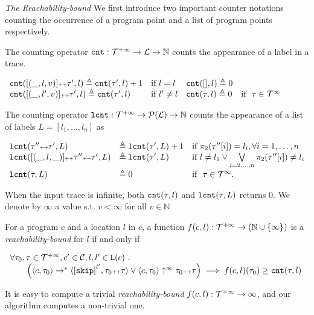 \emph{The Reachability-bound}
We first introduce two important counter notations counting the occurrence of a program point and a list of program points respectively.
\begin{defn}
 \label{def:counter}
The counting operator $\mathtt{cnt} : \mathcal{T}^{+\infty} \to \mathcal{L} \to \mathbb{N}$
counts the appearance of a label in a trace.
\begin{center}
{\small
$
\begin{array}{llll}
\mathtt{cnt}([(\_, l, v)] {\scriptscriptstyle ++} \mathtt{\tau}', l ) \triangleq \mathtt{cnt}(\mathtt{\tau}', l) + 1 & \text{if}~ l = l
&
\mathtt{cnt}({[]}, l) \triangleq 0 & 
\\
\mathtt{cnt}([(\_, l', v)] {\scriptscriptstyle ++} \mathtt{\tau}', l) \triangleq \mathtt{cnt}(\mathtt{\tau}', l) & \text{if}~ l' \neq l
&
\mathtt{cnt}(\mathtt{\tau}, l) \triangleq 0 & \text{if }~ \mathtt{\tau} \in \mathcal{T}^{\infty}
\end{array}
$
}
\end{center}
\end{defn}
\begin{defn}
 \label{def:lcounter}
 The counting operator $\mathtt{lcnt} : \mathcal{T}^{+\infty} \to \mathcal{P}(\mathcal{L}) \to \mathbb{N}$
 counts the appearance of a list of labels $L = [l_1, \ldots, l_n]$ as
{\small
\begin{center}
 $
 \begin{array}{lll}
 \mathtt{lcnt}(\mathtt{\tau}'' {\scriptscriptstyle ++} \mathtt{\tau}', L ) 
 & \triangleq \mathtt{lcnt}(\mathtt{\tau}', L) + 1 & \text{if}~ \pi_2(\mathtt{\tau}''[i]) = l_i, \forall i = 1, \ldots, n
 \\ 
 \mathtt{lcnt}([(\_, l, \_)] {\scriptscriptstyle ++} \mathtt{\tau}'' {\scriptscriptstyle ++} \mathtt{\tau}', L ) 
 & \triangleq \mathtt{lcnt}(\mathtt{\tau}', L) & \text{if}~ l \neq l_1 \lor \bigvee\limits_{i = 2, \ldots, n} \pi_2(\mathtt{\tau}''[i]) \neq l_i
 \\ 
 \mathtt{lcnt}(\mathtt{\tau}, L ) 
 & \triangleq 0 & \text{if }~ \mathtt{\tau} \in \mathcal{T}^{\infty}.
 \end{array}
 $
 \end{center}
 }
\end{defn}
%
When the input trace is infinite, both $\mathtt{cnt}(\mathtt{\tau}, l)$ and $\mathtt{lcnt}(\mathtt{\tau}, L)$ returns $0$.
We denote by $\infty$ a value s.t. $v < \infty $ for all $v \in \mathbb{N}$

\begin{defn}
 \label{def:rb}
 For a program ${c}$ and a location $l$ in $c$,
a function $f(c, l) : \mathcal{T}^{+\infty} \to (\mathbb{N} \cup \{\infty\})$ is a \emph{reachability-bound} for $l$ if and only if
{\small
\begin{center}
 $
\begin{array}{ll}
 \forall \trace_0, \trace \in \tdom, c' \in \cdom, l, l' \in \lvar(c) \st 
 \\ \qquad
 \Big(
 \config{{c}, \trace_0} \to^{*} \config{\clabel{\eskip}^{l'}, \trace_0 \tracecat \trace} 
 \lor 
 \config{{c}, \trace_0} \uparrow^{\infty} \trace_0 \tracecat \trace 
 \Big)
 \implies f({c}, l)(\trace_0) \geq \counter(\trace, l) 
 \end{array}
 $
\end{center}
}
\end{defn}
It is easy to compute a trivial \emph{reachability-bound} $f(c, l): \mathcal{T}^{+\infty} \to \infty$, and 
our algorithm computes a non-trivial one.